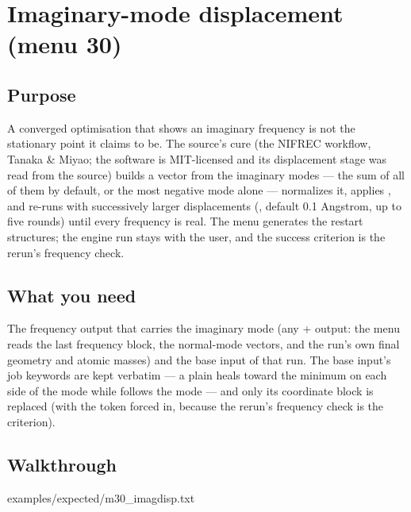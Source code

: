 \chapter{Imaginary-mode displacement (menu 30)}
\label{ch:menu30}

\section{Purpose}

A converged optimisation that shows an imaginary frequency is not the
stationary point it claims to be.  The source's cure (the NIFREC workflow,
Tanaka \& Miyao; the software is MIT-licensed and its displacement stage was
read from the source) builds a vector from the imaginary modes --- the sum of
all of them by default, or the most negative mode alone --- normalizes it,
applies , and re-runs  with
successively larger displacements (, default 0.1
Angstrom, up to five rounds) until every frequency is real.  The menu
generates the restart structures; the engine run stays with the user, and the
success criterion is the rerun's frequency check.

\section{What you need}

The frequency output that carries the imaginary mode (any +
output: the menu reads the last frequency block, the normal-mode vectors, and
the run's own final geometry and atomic masses) and the base input of that
run.  The base input's job keywords are kept verbatim --- a plain 
heals toward the minimum on each side of the mode while  follows
the mode --- and only its coordinate block is replaced (with the 
token forced in, because the rerun's frequency check is the criterion).

\section{Walkthrough}


  {examples/expected/m30_imagdisp.txt}

